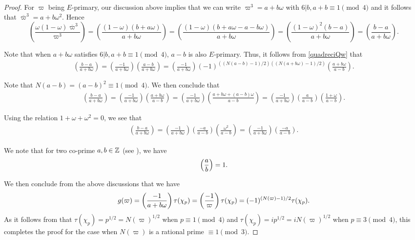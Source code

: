 \documentclass[twoside,leqno,10pt, A4]{amsart}
\begin{document}
\begin{proof}
  For $\varpi$ being $E$-primary, our discussion above implies that we can write $\varpi^3=a+b\omega$ with $6|b, a+b \equiv 1 \pmod 4$ and it follows that $\overline{\varpi}^3=a+b\omega^2$. Hence
\begin{equation*}
 \left(\frac{\omega(1-\omega)\overline{\varpi}^3}{\varpi^3}\right)=\left(\frac{(1-\omega)(b+a\omega)}{a+b\omega}\right)
 =\left(\frac{(1-\omega)(b+a\omega-a-b\omega)}{a+b\omega}\right)=\left(\frac{(1-\omega)^2(b-a)}{a+b\omega}\right)=\left(\frac{b-a}{a+b\omega}\right).
\end{equation*}

    Note that when $a+b\omega$ satisfies $6|b, a+b \equiv 1 \pmod 4$, $a-b$ is also $E$-primary.  Thus, it follows from \eqref{quadreciQw} that
\begin{align*}
 \left(\frac{b-a}{a+b\omega}\right)=\left(\frac{-1}{a+b\omega}\right)\left(\frac{a-b}{a+b\omega}\right)
 =\left(\frac{-1}{a+b\omega}\right)(-1)^{((N(a-b)-1)/2)((N(a+b\omega)-1)/2)}
 \left(\frac {a+b\omega}{a-b}\right).
\end{align*}

   Note that $N(a-b)=(a-b)^2 \equiv 1 \pmod 4$. We then conclude that
\begin{align*}
 \left(\frac{b-a}{a+b\omega}\right)=\left(\frac{-1}{a+b\omega}\right)
 \left(\frac {a+b\omega}{a-b}\right)=\left(\frac{-1}{a+b\omega}\right)
 \left(\frac {a+b\omega+(a-b)\omega}{a-b}\right)=\left(\frac{-1}{a+b\omega}\right)
 \left(\frac {a}{a-b}\right)\left(\frac {1+\omega}{a-b}\right).
\end{align*}

   Using the relation $1+\omega+\omega^2=0$, we see that
\begin{align*}
 \left(\frac{b-a}{a+b\omega}\right)=\left(\frac{-1}{a+b\omega}\right)
 \left(\frac {-a}{a-b}\right)\left(\frac {\omega^2}{a-b}\right)=\left(\frac{-1}{a+b\omega}\right)
 \left(\frac {-a}{a-b}\right).
\end{align*}

    We note that for two co-prime $a, b \in \mathbb Z$ (see \cite[p. 219]{Lemmermeyer}), we have
\begin{align*}
   \left(\frac{a}{b}\right)=1.
\end{align*}

   We then conclude from the above discussions that we have
\begin{align*}
   g(\varpi)=\left(\frac{-1}{a+b\omega}\right)\tau(\chi_p)=\left(\frac{-1}{\varpi}\right)\tau(\chi_p)=(-1)^{(N(\varpi)-1)/2}\tau(\chi_p).
\end{align*}
  As it follows from \cite[Chap. 2]{Da} that $\tau(\chi_p)=p^{1/2}=N(\varpi)^{1/2}$ when $p \equiv 1 \pmod 4$ and $\tau(\chi_p)=ip^{1/2}=iN(\varpi)^{1/2}$ when $p \equiv 3 \pmod 4$, this completes the proof for the case when $N(\varpi)$ is a rational prime $\equiv 1 \pmod 3$. \newline


\end{proof}
\end{document}
